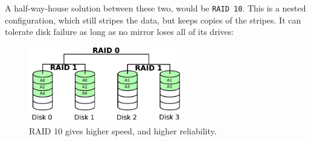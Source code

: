 A half-way-house solution between these two, would be \texttt{RAID 10}. This is
a nested configuration, which still stripes the data, but keeps copies of the
stripes. It can tolerate disk failure as long as no mirror loses all of its
drives:

\begin{figure}[H]
  \centering
  \includegraphics[width=0.6\textwidth]{images/raid10}
  \caption{RAID 10 gives higher speed, and higher reliability.}
  \label{raid10}
\end{figure}  
